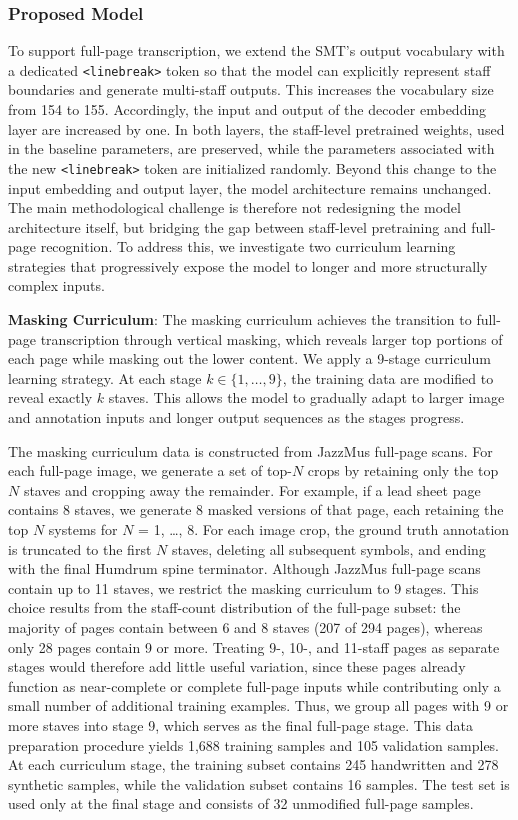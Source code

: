 \documentclass{article}
\begin{document}
\subsubsection{Proposed Model}
To support full-page transcription, we extend the SMT's output vocabulary with a dedicated \texttt{<linebreak>} token so that the model can explicitly represent staff boundaries and generate multi-staff outputs. This increases the vocabulary size from 154 to 155. Accordingly, the input and output of the decoder embedding layer are increased by one. In both layers, the staff-level pretrained weights, used in the baseline parameters, are preserved, while the parameters associated with the new \texttt{<linebreak>} token are initialized randomly. Beyond this change to the input embedding and output layer, the model architecture remains unchanged. The main methodological challenge is therefore not redesigning the model architecture itself, but bridging the gap between staff-level pretraining and full-page recognition. To address this, we investigate two curriculum learning strategies that progressively expose the model to longer and more structurally complex inputs. 

\textbf{Masking Curriculum}:
The masking curriculum achieves the transition to full-page transcription through vertical masking, which reveals larger top portions of each page while masking out the lower content. We apply a 9-stage curriculum learning strategy. At each stage $k \in \{1, \dots, 9\}$, the training data are modified to reveal exactly $k$ staves. This allows the model to gradually adapt to larger image and annotation inputs and longer output sequences as the stages progress. 

The masking curriculum data is constructed from JazzMus full-page scans. For each full-page image, we generate a set of top-$N$ crops by retaining only the top $N$ staves and cropping away the remainder. For example, if a lead sheet page contains 8 staves, we generate 8 masked versions of that page, each retaining the top $N$ systems for $N$ = 1, \dots , 8. For each image crop, the ground truth annotation is truncated to the first $N$ staves, deleting all subsequent symbols, and ending with the final Humdrum spine terminator. Although JazzMus full-page scans contain up to 11 staves, we restrict the masking curriculum to 9 stages. This choice results from the staff-count distribution of the full-page subset: the majority of pages contain between 6 and 8 staves (207 of 294 pages), whereas only 28 pages contain 9 or more. Treating 9-, 10-, and 11-staff pages as separate stages would therefore add little useful variation, since these pages already function as near-complete or complete full-page inputs while contributing only a small number of additional training examples. Thus, we group all pages with 9 or more staves into stage 9, which serves as the final full-page stage. This data preparation procedure yields 1,688 training samples and 105 validation samples. At each curriculum stage, the training subset contains 245 handwritten and 278 synthetic samples, while the validation subset contains 16 samples. The test set is used only at the final stage and consists of 32 unmodified full-page samples. 
\end{document}
